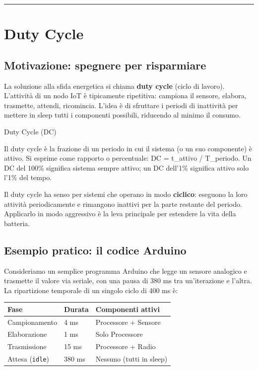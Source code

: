 \documentclass[
  italian,
  openany]{book}
\newcounter{none} %
\begin{document}
\begin{center}\rule{0.5\linewidth}{0.5pt}\end{center}

\section{Duty Cycle}\label{duty-cycle}

\subsection{Motivazione: spegnere per
risparmiare}\label{motivazione-spegnere-per-risparmiare}

La soluzione alla sfida energetica si chiama \textbf{duty cycle} (ciclo
di lavoro). L'attività di un nodo IoT è tipicamente ripetitiva: campiona
il sensore, elabora, trasmette, attendi, ricomincia. L'idea è di
sfruttare i periodi di inattività per mettere in sleep tutti i
componenti possibili, riducendo al minimo il consumo.

\begin{calloutdefinition}{Duty Cycle (DC)}

Il duty cycle è la frazione di un periodo in cui il sistema (o un suo
componente) è attivo. Si esprime come rapporto o percentuale: DC =
t\_attivo / T\_periodo. Un DC del 100\% significa sistema sempre attivo;
un DC dell'1\% significa attivo solo l'1\% del tempo.

\end{calloutdefinition}

Il duty cycle ha senso per sistemi che operano in modo \textbf{ciclico}:
eseguono la loro attività periodicamente e rimangono inattivi per la
parte restante del periodo. Applicarlo in modo aggressivo è la leva
principale per estendere la vita della batteria.

\subsection{Esempio pratico: il codice
Arduino}\label{esempio-pratico-il-codice-arduino}

Consideriamo un semplice programma Arduino che legge un sensore
analogico e trasmette il valore via seriale, con una pausa di 380 ms tra
un'iterazione e l'altra. La ripartizione temporale di un singolo ciclo
di 400 ms è:

{\def\LTcaptype{none} %
\begin{longtable}[]{@{}lll@{}}
\toprule\noalign{}
Fase & Durata & Componenti attivi \\
\midrule\noalign{}
\endhead
\bottomrule\noalign{}
\endlastfoot
Campionamento & 4 ms & Processore + Sensore \\
Elaborazione & 1 ms & Solo Processore \\
Trasmissione & 15 ms & Processore + Radio \\
Attesa (\texttt{idle}) & 380 ms & Nessuno (tutti in sleep) \\
\end{longtable}
}
\end{document}
